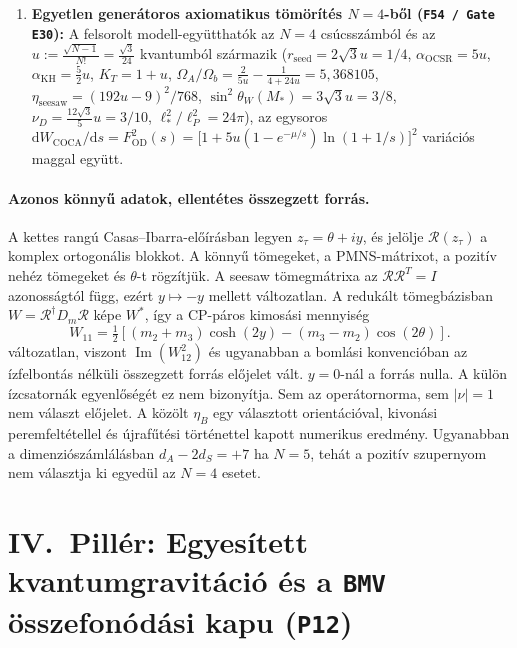 \documentclass[11pt,a4paper]{article}
\begin{document}
\begin{enumerate}[label=(\arabic*),leftmargin=1.8em,itemsep=2pt]
\item \textbf{Egyetlen generátoros axiomatikus tömörítés $N = 4$-ből (\texttt{F54 / Gate E30}):} A felsorolt modell-együtthatók az $N = 4$ csúcsszámból és az $u := \frac{\sqrt{N-1}}{N!} = \frac{\sqrt{3}}{24}$ kvantumból származik ($r_{\mathrm{seed}} = 2\sqrt{3}u = 1/4$, $\alpha_{\mathrm{OCSR}} = 5u$, $\alpha_{\mathrm{KH}} = \frac{5}{2}u$, $K_T = 1+u$, $\Omega_A/\Omega_b = \frac{2}{5u} - \frac{1}{4+24u} = 5{,}368105$, $\eta_{\mathrm{seesaw}} = (192u-9)^2/768$, $\sin^2\theta_W(M_*) = 3\sqrt{3}u = 3/8$, $\nu_D = \frac{12\sqrt{3}}{5}u = 3/10$, $\ell_*^2/\ell_P^2 = 24\pi$), az egysoros $\mathrm{d}W_{\mathrm{COCA}}/\mathrm{d}s = F_{\mathrm{OD}}^2(s) = \bigl[1 + 5u(1 - e^{-\mu/s})\ln(1 + 1/s)\bigr]^2$ variációs maggal együtt.
\end{enumerate}

\paragraph{Azonos könnyű adatok, ellentétes összegzett forrás.}
A kettes rangú Casas--Ibarra-előírásban legyen $z_\tau=\theta+iy$, és jelölje $\mathcal R(z_\tau)$ a komplex ortogonális blokkot. A könnyű tömegeket, a PMNS-mátrixot, a pozitív nehéz tömegeket és $\theta$-t rögzítjük. A seesaw tömegmátrixa az $\mathcal R\mathcal R^{T}=I$ azonosságtól függ, ezért $y\mapsto-y$ mellett változatlan. A redukált tömegbázisban $W=\mathcal R^\dagger D_m\mathcal R$ képe $W^*$, így a CP-páros kimosási mennyiség
\[
 W_{11}=\tfrac12[(m_2+m_3)\cosh(2y)-(m_3-m_2)\cos(2\theta)] .
\]
változatlan, viszont $\operatorname{Im}(W_{12}^2)$ és ugyanabban a bomlási konvencióban az ízfelbontás nélküli összegzett forrás előjelet vált. $y=0$-nál a forrás nulla. A külön ízcsatornák egyenlőségét ez nem bizonyítja. Sem az operátornorma, sem $|\nu|=1$ nem választ előjelet. A közölt $\eta_B$ egy választott orientációval, kivonási peremfeltétellel és újrafűtési történettel kapott numerikus eredmény. Ugyanabban a dimenziószámlálásban $d_A-2d_S=+7$ ha $N=5$, tehát a pozitív szupernyom nem választja ki egyedül az $N=4$ esetet.

\section{IV.\ Pillér: Egyesített kvantumgravitáció és a \texttt{BMV} összefonódási kapu (\texttt{P12})}
\end{document}
